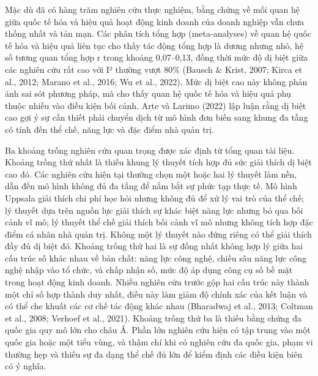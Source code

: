 \documentclass[
  a4paper,
  13pt]{extreport}
\begin{document}
Mặc dù đã có hàng trăm nghiên cứu thực nghiệm, bằng chứng về mối quan hệ
giữa quốc tế hóa và hiệu quả hoạt động kinh doanh của doanh nghiệp vẫn
chưa thống nhất và tản mạn. Các phân tích tổng hợp (meta-analyses) về
quan hệ quốc tế hóa và hiệu quả liên tục cho thấy tác động tổng hợp là
dương nhưng nhỏ, hệ số tương quan tổng hợp r trong khoảng 0,07--0,13,
đồng thời mức độ dị biệt giữa các nghiên cứu rất cao với I² thường vượt
80\% (Bausch \& Krist, 2007; Kirca et al., 2012; Marano et al., 2016; Wu
et al., 2022). Mức dị biệt cao này không phản ánh sai sót phương pháp,
mà cho thấy quan hệ quốc tế hóa và hiệu quả phụ thuộc nhiều vào điều
kiện bối cảnh. Arte và Larimo (2022) lập luận rằng dị biệt cao gợi ý sự
cần thiết phải chuyển dịch từ mô hình đơn biến sang khung đa tầng có
tính đến thể chế, năng lực và đặc điểm nhà quản trị.

Ba khoảng trống nghiên cứu quan trọng được xác định từ tổng quan tài
liệu. Khoảng trống thứ nhất là thiếu khung lý thuyết tích hợp đủ sức
giải thích dị biệt cao đó. Các nghiên cứu hiện tại thường chọn một hoặc
hai lý thuyết làm nền, dẫn đến mô hình không đủ đa tầng để nắm bắt sự
phức tạp thực tế. Mô hình Uppsala giải thích chi phí học hỏi nhưng không
đủ để xử lý vai trò của thể chế; lý thuyết dựa trên nguồn lực giải thích
sự khác biệt năng lực nhưng bỏ qua bối cảnh vĩ mô; lý thuyết thể chế
giải thích bối cảnh vĩ mô nhưng không tích hợp đặc điểm cá nhân nhà quản
trị. Không một lý thuyết nào đứng riêng có thể giải thích đầy đủ dị biệt
đó. Khoảng trống thứ hai là sự đồng nhất không hợp lý giữa hai cấu trúc
số khác nhau về bản chất: năng lực công nghệ, chiều sâu năng lực công
nghệ nhập vào tổ chức, và chấp nhận số, mức độ áp dụng công cụ số bề mặt
trong hoạt động kinh doanh. Nhiều nghiên cứu trước gộp hai cấu trúc này
thành một chỉ số hợp thành duy nhất, điều này làm giảm độ chính xác của
kết luận và có thể che khuất các cơ chế tác động khác nhau (Bharadwaj et
al., 2013; Coltman et al., 2008; Verhoef et al., 2021). Khoảng trống thứ
ba là thiếu bằng chứng đa quốc gia quy mô lớn cho châu Á. Phần lớn
nghiên cứu hiện có tập trung vào một quốc gia hoặc một tiểu vùng, và
thậm chí khi có nghiên cứu đa quốc gia, phạm vi thường hẹp và thiếu sự
đa dạng thể chế đủ lớn để kiểm định các điều kiện biên có ý nghĩa.
\end{document}
